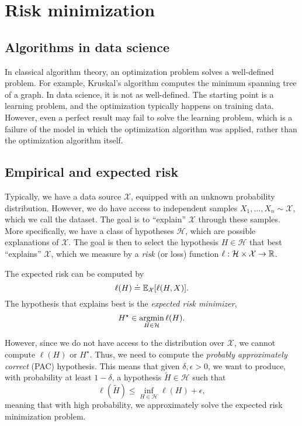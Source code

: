 \section{Risk minimization}

\subsection{Algorithms in data science}

In classical algorithm theory, an optimization problem solves a well-defined problem. For example,
Kruskal's algorithm computes the minimum spanning tree of a graph. In data science, it is not as
well-defined. The starting point is a learning problem, and the optimization typically happens on
training data. However, even a perfect result may fail to solve the learning problem, which is a
failure of the model in which the optimization algorithm was applied, rather than the optimization
algorithm itself.

\subsection{Empirical and expected risk}

Typically, we have a data source $\mathcal{X}$, equipped with an unknown probability distribution.
However, we do have access to independent samples $X_1,\ldots,X_n \sim \mathcal{X}$, which we call
the dataset. The goal is to ``explain'' $\mathcal{X}$ through these samples. More specifically, we
have a class of hypotheses $\mathcal{H}$, which are possible explanations of $\mathcal{X}$. The
goal is then to select the hypothesis $H\in \mathcal{H}$ that best ``explains'' $\mathcal{X}$,
which we measure by a \textit{risk} (or loss) function $\ell: \mathcal{H}\times \mathcal{X}\to \mathbb{R}$.

The expected risk can be computed by \[
    \ell(H) \doteq \mathbb{E}_{\mathcal{X}}[\ell(H, X)].
\]
The hypothesis that explains best is the \textit{expected risk minimizer}, \[
    H^\star \in \operatorname*{argmin}_{H\in \mathcal{H}} \ell(H).
\]

However, since we do not have access to the distribution over $\mathcal{X}$, we cannot compute
$\ell(H)$ or $H^\star$. Thus, we need to compute the \textit{probably approximately correct} (PAC)
hypothesis. This means that given $\delta,\epsilon > 0$, we want to produce, with probability at
least $1-\delta$, a hypothesis $\tilde{H}\in \mathcal{H}$ such that \[
    \ell(\tilde{H}) \leq \inf_{H\in \mathcal{H}} \ell(H) + \epsilon,
\]
meaning that with high probability, we approximately solve the expected risk minimization problem.

